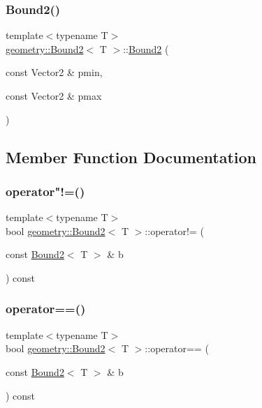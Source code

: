 \subsubsection{\texorpdfstring{Bound2()}{Bound2()}}
{\footnotesize\ttfamily template$<$typename T$>$ \\
\mbox{\hyperlink{classgeometry_1_1Bound2}{geometry\+::\+Bound2}}$<$ T $>$\+::\mbox{\hyperlink{classgeometry_1_1Bound2}{Bound2}} (\begin{DoxyParamCaption}\item[{const Vector2 \&}]{pmin,  }\item[{const Vector2 \&}]{pmax }\end{DoxyParamCaption})\hspace{0.3cm}{\ttfamily [inline]}}



\subsection{Member Function Documentation}
\mbox{\label{classgeometry_1_1Bound2_a8e78812595789edfd02d67d2ed229ccb}} 
\subsubsection{\texorpdfstring{operator"!=()}{operator!=()}}
{\footnotesize\ttfamily template$<$typename T$>$ \\
bool \mbox{\hyperlink{classgeometry_1_1Bound2}{geometry\+::\+Bound2}}$<$ T $>$\+::operator!= (\begin{DoxyParamCaption}\item[{const \mbox{\hyperlink{classgeometry_1_1Bound2}{Bound2}}$<$ T $>$ \&}]{b }\end{DoxyParamCaption}) const\hspace{0.3cm}{\ttfamily [inline]}}

\mbox{\label{classgeometry_1_1Bound2_af22badcc6691460b038d8e6ebbc09681}} 
\subsubsection{\texorpdfstring{operator==()}{operator==()}}
{\footnotesize\ttfamily template$<$typename T$>$ \\
bool \mbox{\hyperlink{classgeometry_1_1Bound2}{geometry\+::\+Bound2}}$<$ T $>$\+::operator== (\begin{DoxyParamCaption}\item[{const \mbox{\hyperlink{classgeometry_1_1Bound2}{Bound2}}$<$ T $>$ \&}]{b }\end{DoxyParamCaption}) const\hspace{0.3cm}{\ttfamily [inline]}}



